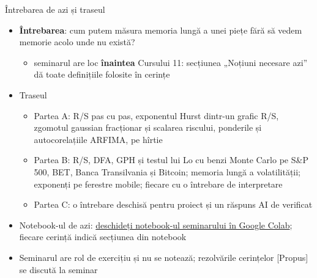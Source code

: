 \begin{frame}{Întrebarea de azi și traseul}
\itemsize{\small}
\begin{itemize}
    \item \textbf{Întrebarea}: cum putem măsura memoria lungă a unei piețe fără să vedem memorie acolo unde nu există?
    \begin{itemize}
        \item seminarul are loc \textbf{înaintea} Cursului 11: secțiunea „Noțiuni necesare azi” dă toate definițiile folosite în cerințe
    \end{itemize}
    \item Traseul
    \begin{itemize}
        \item Partea A: R/S pas cu pas, exponentul Hurst dintr-un grafic R/S, zgomotul gaussian fracționar și scalarea riscului, ponderile și autocorelațiile ARFIMA, pe hîrtie
        \item Partea B: R/S, DFA, GPH și testul lui Lo cu benzi Monte Carlo pe S\&P 500, BET, Banca Transilvania și Bitcoin; memoria lungă a volatilității; exponenți pe ferestre mobile; fiecare cu o întrebare de interpretare
        \item Partea C: o întrebare deschisă pentru proiect și un răspuns AI de verificat
    \end{itemize}
    \item Notebook-ul de azi: \href{\nb}{deschideți notebook-ul seminarului în Google Colab}; fiecare cerință indică secțiunea din notebook
    \item Seminarul are rol de exercițiu și nu se notează; rezolvările cerințelor [Propus] se discută la seminar
\end{itemize}
\end{frame}

